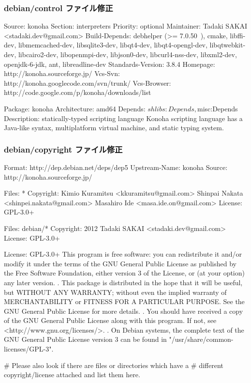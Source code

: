 \documentclass[mingoth,a4paper]{jsarticle}
\begin{document}
\subsubsection{debian/control ファイル修正}
\begin{commandline}
Source: konoha
Section: interpreters
Priority: optional
Maintainer: Tadaki SAKAI <stadaki.dev@gmail.com>
Build-Depends: debhelper (>= 7.0.50~), cmake, libffi-dev, libmemcached-dev,
  libsqlite3-dev, libqt4-dev, libqt4-opengl-dev, libqtwebkit-dev, libcairo2-dev,
  libopenmpi-dev, libjson0-dev, libcurl4-nss-dev, libxml2-dev, openjdk-6-jdk, ant,
  libreadline-dev
Standards-Version: 3.8.4
Homepage: http://konoha.sourceforge.jp/
Vcs-Svn: http://konoha.googlecode.com/svn/trunk/
Vcs-Browser: http://code.google.com/p/konoha/downloads/list

Package: konoha
Architecture: amd64
Depends: ${shlibs:Depends}, ${misc:Depends}
Description: statically-typed scripting language
 Konoha scripting language has a Java-like syntax, multiplatform
 virtual machine, and static typing system.
\end{commandline}


\subsubsection{debian/copyright ファイル修正}
\begin{commandline}
Format: http://dep.debian.net/deps/dep5
Upstream-Name: konoha
Source: http://konoha.sourceforge.jp/

Files: *
Copyright: Kimio Kuramitsu <kkuramitsu@gmail.com>
           Shinpai Nakata <shinpei.nakata@gmail.com>
           Masahiro Ide <masa.ide.on@gmail.com>
License: GPL-3.0+

Files: debian/*
Copyright: 2012 Tadaki SAKAI <stadaki.dev@gmail.com>
License: GPL-3.0+

License: GPL-3.0+
 This program is free software: you can redistribute it and/or modify
 it under the terms of the GNU General Public License as published by
 the Free Software Foundation, either version 3 of the License, or
 (at your option) any later version.
 .
 This package is distributed in the hope that it will be useful,
 but WITHOUT ANY WARRANTY; without even the implied warranty of
 MERCHANTABILITY or FITNESS FOR A PARTICULAR PURPOSE.  See the
 GNU General Public License for more details.
 .
 You should have received a copy of the GNU General Public License
 along with this program. If not, see <http://www.gnu.org/licenses/>.
 .
 On Debian systems, the complete text of the GNU General
 Public License version 3 can be found in "/usr/share/common-licenses/GPL-3".

# Please also look if there are files or directories which have a
# different copyright/license attached and list them here.
\end{commandline}
\end{document}
